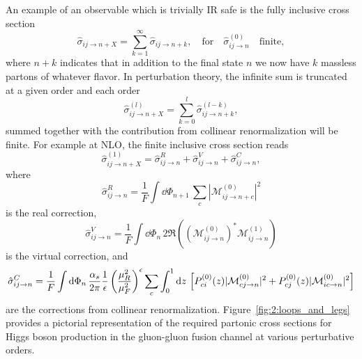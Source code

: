 An example of an observable which is trivially IR safe is the fully inclusive cross section
\begin{equation}
\hat{\sigma}_{ij \rightarrow n+X} = \sum_{k = 1}^\infty \hat{\sigma}_{ij \rightarrow n + k}, \quad \text{for} \quad \hat{\sigma}_{ij \rightarrow n}^{(0)} \quad \text{finite},
\end{equation}
where $n + k$ indicates that in addition to the final state $n$ we now have $k$ massless partons of whatever flavor. In perturbation theory, the infinite sum is truncated at a given order and each order
\begin{equation}
\hat{\sigma}_{ij \rightarrow n+X}^{(l)} = \sum_{k = 0}^l \hat{\sigma}_{ij \rightarrow n + k}^{(l - k)},
\end{equation}
summed together with the contribution from collinear renormalization will be finite. For example at \acs{NLO}, the finite inclusive cross section reads
\begin{equation}
\hat{\sigma}_{ij \rightarrow n+X}^{(1)} = \hat{\sigma}_{ij \rightarrow n}^{R} + \hat{\sigma}_{ij \rightarrow n}^{V} + \hat{\sigma}_{ij \rightarrow n}^C,
\end{equation}
where
\begin{equation}
\hat{\sigma}_{ij \rightarrow n}^R = \frac{1}{F}\int \dd \Phi_{n + 1} \, \sum_c |\mathcal{M}_{ij \rightarrow n + c}^{(0)}|^2
\end{equation}
is the real correction,
\begin{equation}
\hat{\sigma}_{ij \rightarrow n}^V = \frac{1}{F} \int \dd \Phi_n \, 2 \Re\! \left( \left(\mathcal{M}_{ij \rightarrow n}^{(0)}\right)^* \mathcal{M}_{ij \rightarrow n}^{(1)} \right)
\end{equation}
is the virtual correction, and
\begin{equation}
\hat{\sigma}_{ij \rightarrow n}^C = \frac{1}{F} \int \mathrm{d} \Phi_n \, \frac{\alpha_s}{2 \pi} \frac{1}{\epsilon} \left(\frac{\mu_R^2}{\mu_F^2} \right)^\epsilon \sum_c \int_0^1 \mathrm{d} z\,  \left[ P_{ci}^{(0)}(z) |\mathcal{M}_{cj \rightarrow n}^{(0)}|^2 + P_{cj}^{(0)}(z) |\mathcal{M}_{ic \rightarrow n}^{(0)}|^2 \right]
\label{eq:2:sigma_C}
\end{equation}
are the corrections from collinear renormalization. Figure~\ref{fig:2:loops_and_legs} provides a pictorial representation of the required partonic cross sections for Higgs boson production in the gluon-gluon fusion channel at various perturbative orders.
